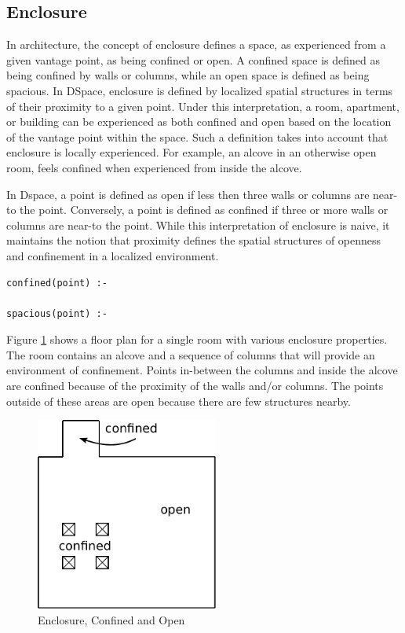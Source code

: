 \documentclass[12pt]{ucthesis}
\begin{document}
\subsection{Enclosure} 
In architecture, the concept of enclosure defines a space, as experienced from a given vantage point, as being confined or open. A confined space is defined as being confined by walls or columns, while an open space is defined as being spacious. In DSpace, enclosure is defined by localized spatial structures in terms of their proximity to a given point. Under this interpretation, a room, apartment, or building can be experienced as both confined and open based on the location of the vantage point within the space. Such a definition takes into account that enclosure is locally experienced. For example, an alcove in an otherwise open room, feels confined when experienced from inside the alcove.

In Dspace, a point is defined as open if less then three walls or columns are near-to the point. Conversely, a point is defined as confined if three or more walls or columns are near-to the point. While this interpretation of enclosure is naive, it maintains the notion that proximity defines the spatial structures of openness and confinement in a localized environment.   

\begin{verbatim}
confined(point) :-  

spacious(point) :-

\end{verbatim} 

Figure \ref{enclosure} shows a floor plan for a single room with various enclosure properties. The room contains an alcove and a sequence of columns that will provide an environment of confinement. Points in-between the columns and inside the alcove are confined because of the proximity of the walls and/or columns. The points outside of these areas are open because there are few structures nearby.

\begin{figure}[H]
\centering
\includegraphics[width=60mm]{spacious-confined}
\caption{Enclosure, Confined and Open}
\label{enclosure}
\end{figure}
\end{document}
